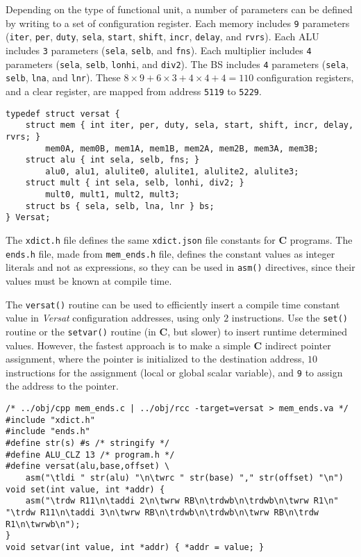 Depending on the type of functional unit, a number of
parameters can be defined by writing to a set of
configuration register.
Each memory includes {\tt 9} parameters ({\tt iter},
{\tt per}, {\tt duty}, {\tt sela}, {\tt start}, {\tt shift},
{\tt incr}, {\tt delay}, and {\tt rvrs}).
Each {\sc ALU} includes {\tt 3} parameters ({\tt sela},
{\tt selb}, and {\tt fns}).
Each multiplier includes {\tt 4} parameters ({\tt sela},
{\tt selb}, {\tt lonhi}, and {\tt div2}).
The {\sc BS} includes {\tt 4} parameters ({\tt sela},
{\tt selb}, {\tt lna}, and {\tt lnr}).
These $8 \times 9 + 6 \times 3 + 4 \times 4 + 4 = 110$
configuration registers, and a clear register, are mapped
from address {\tt 5119} to {\tt 5229}.
\begin{Verbatim}[baselinestretch=1.2]
typedef struct versat {
    struct mem { int iter, per, duty, sela, start, shift, incr, delay, rvrs; }
        mem0A, mem0B, mem1A, mem1B, mem2A, mem2B, mem3A, mem3B;
    struct alu { int sela, selb, fns; }
        alu0, alu1, alulite0, alulite1, alulite2, alulite3;
    struct mult { int sela, selb, lonhi, div2; }
        mult0, mult1, mult2, mult3;
    struct bs { sela, selb, lna, lnr } bs;
} Versat;
\end{Verbatim}

The {\tt xdict.h} file defines the same {\tt xdict.json}
file constants for {\bf C} programs.
The {\tt ends.h} file, made from {\tt mem\_ends.h} file,
defines the constant values as integer literals and not
as expressions, so they can be used in {\tt asm()}
directives, since their values must be known at compile time.

The {\tt versat()} routine can be used to efficiently insert
a compile time constant value in {\it Versat} configuration
addresses, using only $2$ instructions.
Use the {\tt set()} routine or the {\tt setvar()} routine
(in {\bf C}, but slower) to insert runtime determined values.
However, the fastest approach is to make a simple {\bf C}
indirect pointer assignment, where the pointer is initialized
to the destination address, $10$ instructions for the
assignment (local or global scalar variable), and {\tt 9}
to assign the address to the pointer.
\begin{Verbatim}[baselinestretch=1.2]
/* ../obj/cpp mem_ends.c | ../obj/rcc -target=versat > mem_ends.va */
#include "xdict.h"
#include "ends.h"
#define str(s) #s /* stringify */
#define ALU_CLZ 13 /* program.h */
#define versat(alu,base,offset) \
    asm("\tldi " str(alu) "\n\twrc " str(base) "," str(offset) "\n")
void set(int value, int *addr) {
    asm("\trdw R11\n\taddi 2\n\twrw RB\n\trdwb\n\trdwb\n\twrw R1\n"
"\trdw R11\n\taddi 3\n\twrw RB\n\trdwb\n\trdwb\n\twrw RB\n\trdw R1\n\twrwb\n");
}
void setvar(int value, int *addr) { *addr = value; }
\end{Verbatim}


